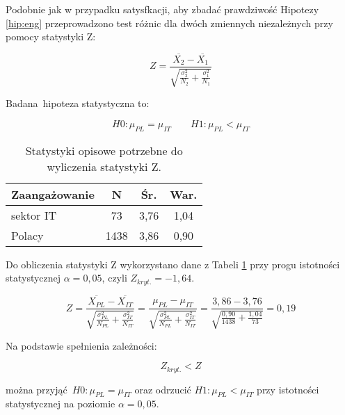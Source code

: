 Podobnie jak w przypadku satysfkacji, aby zbadać prawdziwość Hipotezy \ref{hip:eng} przeprowadzono test różnic dla dwóch zmiennych niezależnych przy pomocy statystyki Z:

\begin{equation}
  Z = \frac{\overline{X_2} - \overline{X_1}}{\sqrt{\frac{\sigma^2_2}{N_2}+\frac{\sigma^2_1}{N_1}}}
\end{equation}

Badana hipoteza statystyczna  to:

\begin{equation}
  H0: \mu_{PL} = \mu_{IT} \qquad H1: \mu_{PL} < \mu_{IT}
\end{equation}

\begin{table}[h!b]
  \begin{center}
    \begin{tabular}{l | c c c }
      Zaangażowanie & N & Śr. & War. \\ \hline
      sektor IT & 73 & 3,76 & 1,04 \\
      Polacy & 1438 & 3,86 & 0,90 \\
    \end{tabular}
  \end{center}
  \caption{Statystyki opisowe potrzebne do wyliczenia statystyki Z.}
  \label{tab:uwes-norms-data}
\end{table}

Do obliczenia statystyki Z wykorzystano dane z Tabeli \ref{tab:uwes-norms-data} przy progu istotności statystycznej $\alpha = 0,05$, czyli $Z_{kryt.} = -1,64$.

\begin{equation}
  Z = \frac{\overline{X_{PL}} - \overline{X_{IT}}}{\sqrt{\frac{\sigma^2_{PL}}{N_{PL}}+\frac{\sigma^2_{IT}}{N_{IT}}}} = \frac{\mu_{PL} - \mu_{IT}}{\sqrt{\frac{\sigma^2_{PL}}{N_{PL}}+\frac{\sigma^2_{IT}}{N_{IT}}}} = \frac{3,86- 3,76}{\sqrt{\frac{0,90}{1438}+\frac{1,04}{73}}} = 0,19
\end{equation}

Na podstawie spełnienia zależności:

\begin{equation}
  Z_{kryt.} < Z
\end{equation}

można przyjąć $H0: \mu_{PL} = \mu_{IT}$ oraz odrzucić $H1: \mu_{PL} < \mu_{IT}$ przy istotności statystycznej na poziomie $\alpha = 0,05$.


